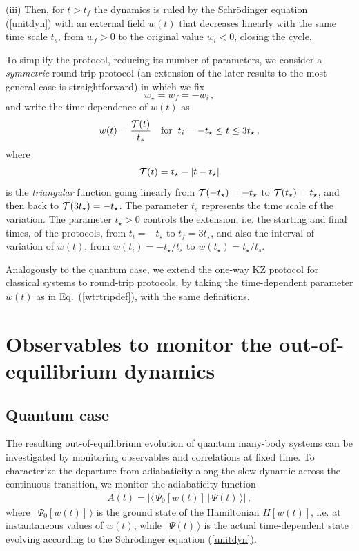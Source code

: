 (iii) Then, for $t>t_f$ the dynamics is ruled by the Schr\"odinger
equation (\ref{unitdyn}) with an external field $w(t)$ that decreases
linearly with the same time scale $t_s$, from $w_f>0$ to the original
value $w_i<0$, closing the cycle.

To simplify the protocol, reducing its number of parameters, we
consider a {\em symmetric} round-trip protocol (an extension of the
later results to the most general case is straightforward) in which we
fix
\begin{equation}
  w_\star = w_f = - w_i \,,
  \label{wstardef}
  \end{equation}
and write the time dependence of $w(t)$ as
  \begin{eqnarray}
  w(t) = {{\cal T}(t)\over t_s}\quad {\rm for}\;\; t_i=-t_\star \le t
  \le 3t_\star\,,
\label{wtrtripdef}
\end{eqnarray}
where
\begin{equation}
  {\cal T}(t) = t_\star - |t-t_\star|
\label{triafunc}
\end{equation}
is the {\em triangular} function going linearly from ${\cal
  T}(-t_\star)=-t_\star$ to ${\cal T}(t_\star)=t_\star$, and then back
to ${\cal T}(3t_\star)=-t_\star$. The parameter $t_s$ represents the
time scale of the variation. The parameter $t_\star>0$ controls the
extension, i.e.  the starting and final times, of the protocols, from
$t_i=-t_\star$ to $t_f = 3 t_\star$, and also the interval of
variation of $w(t)$, from $w(t_i)=-t_\star/t_s$ to $w(t_\star) =
t_\star/t_s$.

Analogously to the quantum case, we extend the one-way KZ protocol for
classical systems to round-trip protocols, by taking the
time-dependent parameter $w(t)$ as in Eq.~(\ref{wtrtripdef}), with the
same definitions.



\section{Observables to monitor the out-of-equilibrium dynamics}
\label{obsdyn}

\subsection{Quantum case}
\label{quobs}

The resulting out-of-equilibrium evolution of quantum many-body
systems can be investigated by monitoring observables and correlations
at fixed time.  To characterize the departure from adiabaticity along
the slow dynamic across the continuous transition, we monitor the
adiabaticity function
\begin{eqnarray}
  A(t) = |\langle \, \Psi_0[w(t)] \, | \, \Psi(t) \, \rangle|\,,
  \label{adtfunc}
\end{eqnarray}
where $|\,\Psi_0[w(t)]\,\rangle$ is the ground state of the
Hamiltonian $H[w(t)]$, i.e. at instantaneous values of $w(t)$,
while $|\,\Psi(t)\,\rangle$ is the actual time-dependent state
evolving according to the Schr\"odinger equation (\ref{unitdyn}).

